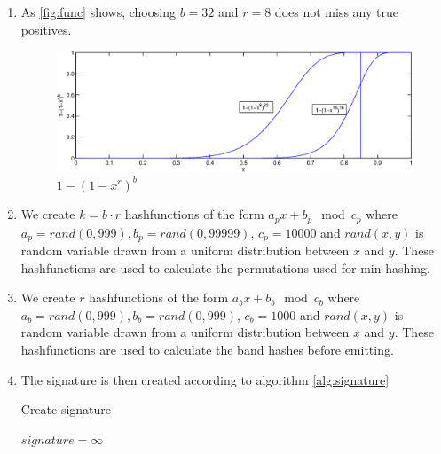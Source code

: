 \documentclass[a4paper, 11pt]{article}
\begin{document}
\begin{enumerate} 

\item As \autoref{fig:func} shows, choosing $b=32$ and $r=8$ does not miss any true positives.

\begin{figure}
\centering
\includegraphics[scale=.5]{project1/func.eps}
\caption{$1-(1-x^r)^b$}\label{fig:func}
\end{figure}

\item We create $k = b \cdot r$ hashfunctions of the form $ a_px + b_p \mod c_p$
where $a_p=rand(0,999), b_p=rand(0,99999)$, $c_p=10000$ and $rand(x,y)$ is
random variable drawn from a uniform distribution between $x$ and $y$. These
hashfunctions are used to calculate the permutations used for min-hashing.

\item We create $r$ hashfunctions of the form $ a_bx + b_b \mod c_b$ where
$a_b=rand(0,999), b_b=rand(0,999)$, $c_b=1000$ and $rand(x,y)$ is random
variable drawn from a uniform distribution between $x$ and $y$. These
hashfunctions are used to calculate the band hashes before emitting.

\item The signature is then created according to algorithm \autoref{alg:signature}

\begin{algorithm}

\caption{Create signature}\label{alg:signature}

\begin{algorithmic} 

\STATE $signature = \infty$




\ENDFOR

\ENDFOR


\end{algorithmic}
\end{algorithm}
\end{enumerate}
\end{document}

